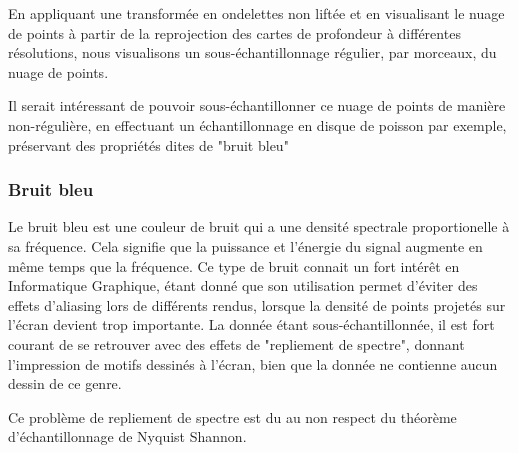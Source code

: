 \documentclass{report}
\begin{document}
En appliquant une transformée en ondelettes non liftée et en visualisant le nuage de points à partir de la reprojection des cartes de profondeur à différentes résolutions, nous visualisons un sous-échantillonnage régulier, par morceaux, du nuage de points.

Il serait intéressant de pouvoir sous-échantillonner ce nuage de points de manière non-régulière, en effectuant un échantillonnage en disque de poisson par exemple, préservant des propriétés dites de "bruit bleu"

\subsubsection{Bruit bleu}
\label{subs:Bruit_bleu}

Le bruit bleu est une couleur de bruit qui a une densité spectrale proportionelle à sa fréquence.
Cela signifie que la puissance et l'énergie du signal augmente en même temps que la fréquence.
Ce type de bruit connait un fort intérêt en Informatique Graphique, étant donné que son utilisation permet d'éviter des effets d'aliasing lors de différents rendus, lorsque la densité de points projetés sur l'écran devient trop importante.
La donnée étant sous-échantillonnée, il est fort courant de se retrouver avec des effets de "repliement de spectre", donnant l'impression de motifs dessinés à l'écran, bien que la donnée ne contienne aucun dessin de ce genre.

Ce problème de repliement de spectre est du au non respect du théorème d'échantillonnage de Nyquist Shannon.






\end{document}
